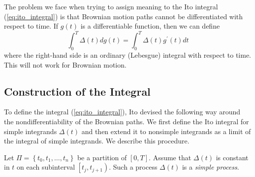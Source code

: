 \documentclass[\topdir/lecture\_notes.tex]{subfiles}
\begin{document}
The problem we face when trying to assign meaning to the Ito integral (\ref{eq:ito_integral}) is that Brownian motion paths cannot be differentiated with respect to time. If $g(t)$ is a differentiable function, then we can define
\begin{equation*}
\int_{0}^{T} \Delta(t) dg(t)=\int_{0}^{T} \Delta(t) g^{\prime}(t) dt
\end{equation*}
where the right-hand side is an ordinary (Lebesgue) integral with respect to time. This will not work for Brownian motion.

\subsection{Construction of the Integral}
To define the integral (\ref{eq:ito_integral}), Ito devised the following way around the nondifferentiability of the Brownian paths. We first define the Ito integral for simple integrands $\Delta(t)$ and then extend it to nonsimple integrands as a limit of the integral of simple integrands. We describe this procedure.

Let $\Pi=\left\{t_{0}, t_{1}, \ldots, t_{n}\right\}$ be a partition of $[0, T]$. Assume that $\Delta(t)$ is constant in $t$ on each subinterval $\left[t_{j}, t_{j+1}\right)$. Such a process $\Delta(t)$ is a \emph{simple process}.
\end{document}
